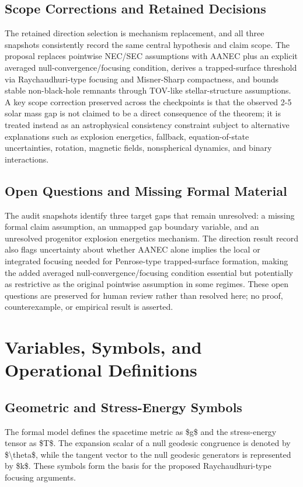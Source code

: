 \documentclass[conference]{IEEEtran}
\begin{document}
\subsection{Scope Corrections and Retained Decisions}
The retained direction selection is mechanism replacement, and all three snapshots consistently record the same central hypothesis and claim scope. The proposal replaces pointwise NEC/SEC assumptions with AANEC plus an explicit averaged null-convergence/focusing condition, derives a trapped-surface threshold via Raychaudhuri-type focusing and Misner-Sharp compactness, and bounds stable non-black-hole remnants through TOV-like stellar-structure assumptions. A key scope correction preserved across the checkpoints is that the observed 2-5 solar mass gap is not claimed to be a direct consequence of the theorem; it is treated instead as an astrophysical consistency constraint subject to alternative explanations such as explosion energetics, fallback, equation-of-state uncertainties, rotation, magnetic fields, nonspherical dynamics, and binary interactions.

\subsection{Open Questions and Missing Formal Material}
The audit snapshots identify three target gaps that remain unresolved: a missing formal claim assumption, an unmapped gap boundary variable, and an unresolved progenitor explosion energetics mechanism. The direction result record also flags uncertainty about whether AANEC alone implies the local or integrated focusing needed for Penrose-type trapped-surface formation, making the added averaged null-convergence/focusing condition essential but potentially as restrictive as the original pointwise assumption in some regimes. These open questions are preserved for human review rather than resolved here; no proof, counterexample, or empirical result is asserted.

\section{Variables, Symbols, and Operational Definitions}
\subsection{Geometric and Stress-Energy Symbols}
The formal model defines the spacetime metric as \$g\$ and the stress-energy tensor as \$T\$. The expansion scalar of a null geodesic congruence is denoted by \$\textbackslash{}theta\$, while the tangent vector to the null geodesic generators is represented by \$k\$. These symbols form the basis for the proposed Raychaudhuri-type focusing arguments.
\end{document}
